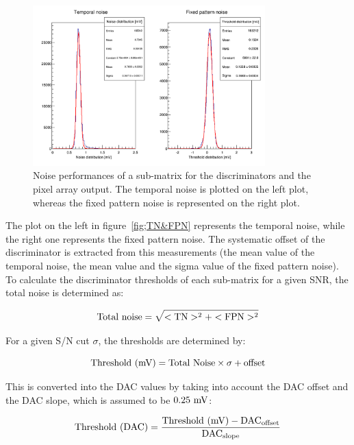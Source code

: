   \begin{figure}[!h]
    \centering
    \includegraphics[width=0.8\textwidth]{Pictures/labTests/noise_A.png}
    \caption{Noise performances of a sub-matrix for the discriminators and the pixel array output. The temporal noise is plotted on the left plot, whereas the fixed pattern noise is represented on the right plot.} 
    \label{fig:TN&FPN}
  \end{figure}

  The plot on the left in figure~\ref{fig;TN&FPN} represents the temporal noise, while the right one represents the fixed pattern noise.
  The systematic offset of the discriminator is extracted from this measurements (the mean value of the temporal noise, the mean value and the sigma value of the fixed pattern noise).
  To calculate the discriminator thresholds of each sub-matrix for a given \gls{SNR}, the total noise is determined as:
  
  \begin{equation}
    \rm{Total~noise} = \sqrt{<\rm{TN}>^2 + <\rm{FPN}>^2}
  \end{equation}

  For a given S/N cut $\sigma$, the thresholds are determined by:

  \begin{equation}
    \rm{Threshold~(mV)} = \rm{Total~Noise} \times \sigma + \rm{offset}
  \end{equation}

  This is converted into the DAC values by taking into account the DAC offset and the DAC slope, which is assumed to be $0.25~\rm{mV}$:
  
  \begin{equation}
    \rm{Threshold~(DAC)} = \frac{\rm{Threshold~(mV)} - \rm{DAC}_{\rm{offset}}}{\rm{DAC}_{\rm{slope}}}
  \end{equation}



